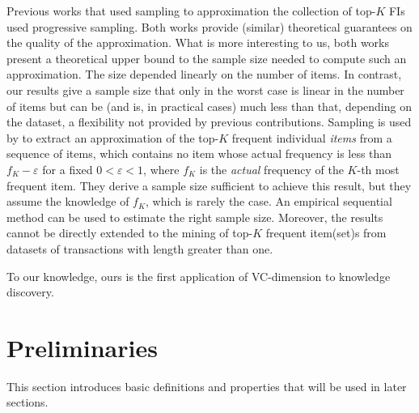 Previous works that used sampling to approximation the collection of top-$K$
FIs~\citep{SchefferW02,PietracaprinaRUV10} used progressive sampling. Both
works provide (similar) theoretical guarantees on the quality of the
approximation. What is more interesting to us, both works present a theoretical
upper bound to the sample size needed to compute such an approximation. The size
depended linearly on the number of items. 
In contrast, our results give a sample size that only in the worst case is
linear in the number of items but can be (and is, in practical cases) much less
than that, depending on the dataset, a flexibility not provided by previous
contributions. 
Sampling is used by \citet{VasudevanV09} to extract
an approximation of the top-$K$ frequent individual \emph{items} from a sequence
of items, which contains no item whose actual frequency is less than
$f_K-\varepsilon$ for a fixed $0<\varepsilon<1$, where $f_K$ is the
\emph{actual} frequency of the $K$-th most frequent item. They derive a sample
size sufficient to achieve this result, but they assume the knowledge of $f_K$,
which is rarely the case. An empirical sequential method can be used to estimate
the right sample size. Moreover, the results cannot be directly extended to the
mining of top-$K$ frequent item(set)s from datasets of transactions with length
greater than one.

To our knowledge, ours is the first application of VC-dimension to
knowledge discovery.

\section{Preliminaries}\label{sec:vcmineprelim}

This section introduces basic definitions and properties that will be used in later sections.

